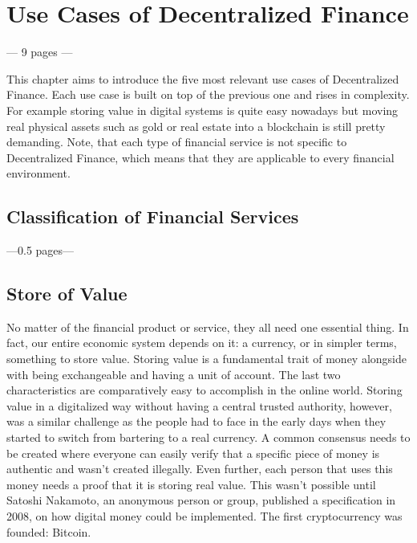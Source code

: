 \chapter{Use Cases of Decentralized Finance}
--- 9 pages ---
\label{cha:UseCasesDecentralizedFinance}

This chapter aims to introduce the five most relevant use cases of Decentralized Finance. Each use case is built on top of the previous one and rises in complexity. For example storing value in digital systems is quite easy nowadays but moving real physical assets such as gold or real estate into a blockchain is still pretty demanding. Note, that each type of financial service is not specific to Decentralized Finance, which means that they are applicable to every financial environment.

\section{Classification of Financial Services}
---0.5 pages---


\section{Store of Value}
No matter of the financial product or service, they all need one essential thing. In fact, our entire economic system depends on it: a currency, or in simpler terms, something to store value. Storing value is a fundamental trait of money alongside with being exchangeable and having a unit of account. The last two characteristics are comparatively easy to accomplish in the online world. Storing value in a digitalized way without having a central trusted authority, however, was a similar challenge as the people had to face in the early days when they started to switch from bartering to a real currency. A common consensus needs to be created where everyone can easily verify that a specific piece of money is authentic and wasn't created illegally. Even further, each person that uses this money needs a proof that it is storing real value. This wasn't possible until Satoshi Nakamoto, an anonymous person or group, published a specification \cite{Nakamoto2008} in 2008, on how digital money could be implemented. The first cryptocurrency was founded: Bitcoin.

